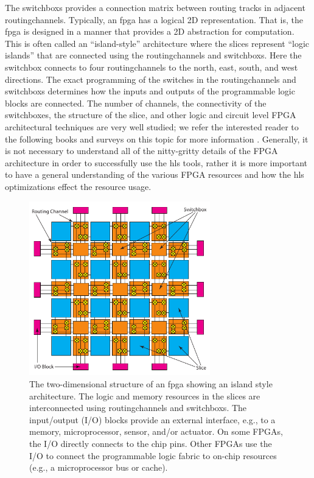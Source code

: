 The \glspl{switchbox} provides a connection matrix between routing tracks in adjacent \glspl{routingchannel}. Typically, an \gls{fpga} has a logical 2D representation. That is, the \gls{fpga} is designed in a manner that provides a 2D abstraction for computation. This is often called an ``island-style'' architecture where the \glspl{slice} represent ``logic islands'' that are connected using the \glspl{routingchannel} and \glspl{switchbox}. Here the \gls{switchbox} connects to four \glspl{routingchannel} to the north, east, south, and west directions. The exact programming of the switches in the \glspl{routingchannel} and \glspl{switchbox} determines how the inputs and outputs of the programmable logic blocks are connected. The number of channels, the connectivity of the switchboxes, the structure of the slice, and other logic and circuit level FPGA architectural techniques are very well studied; we refer the interested reader to the following books and surveys on this topic for more information \cite{brown1996fpga, betz1997vpr, hauck2010reconfigurable}. Generally, it is not necessary to understand all of the nitty-gritty details of the FPGA architecture in order to successfully use the \gls{hls} tools, rather it is more important to have a general understanding of the various FPGA resources and how the \gls{hls} optimizations effect the resource usage.

\begin{figure}
\centering
\includegraphics[width= 0.7\textwidth]{images/fpga}
\caption{ The two-dimensional structure of an \gls{fpga} showing an island style architecture. The logic and memory resources in the \glspl{slice} are interconnected using \glspl{routingchannel} and \glspl{switchbox}. The input/output (I/O) blocks provide an external interface, e.g., to a memory, microprocessor, sensor, and/or actuator. On some FPGAs, the I/O directly connects to the chip pins. Other FPGAs use the I/O to connect the programmable logic fabric to on-chip resources (e.g., a microprocessor bus or cache).   }
\label{fig:fpga}
\end{figure}

